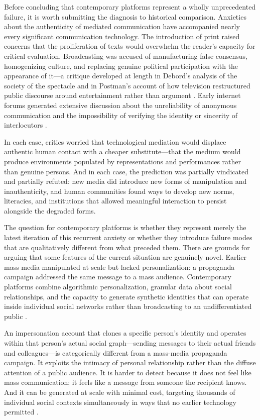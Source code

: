 \documentclass[12pt,a4paper]{article}
\begin{document}
Before concluding that contemporary platforms represent a wholly unprecedented failure, it is
worth submitting the diagnosis to historical comparison. Anxieties about the authenticity of
mediated communication have accompanied nearly every significant communication technology.
The introduction of print raised concerns that the proliferation of texts would overwhelm the
reader's capacity for critical evaluation. Broadcasting was accused of manufacturing false
consensus, homogenizing culture, and replacing genuine political participation with the
appearance of it---a critique developed at length in Debord's analysis of the society of the
spectacle \citep{debord1967} and in Postman's account of how television restructured public
discourse around entertainment rather than argument \citep{postman1985}. Early internet forums
generated extensive discussion about the unreliability of anonymous communication and the
impossibility of verifying the identity or sincerity of interlocutors \citep{boyd2014}.

In each case, critics worried that technological mediation would displace authentic human contact
with a cheaper substitute---that the medium would produce environments populated by
representations and performances rather than genuine persons. And in each case, the prediction
was partially vindicated and partially refuted: new media did introduce new forms of manipulation
and inauthenticity, and human communities found ways to develop new norms, literacies, and
institutions that allowed meaningful interaction to persist alongside the degraded forms.

The question for contemporary platforms is whether they represent merely the latest iteration of
this recurrent anxiety or whether they introduce failure modes that are qualitatively different
from what preceded them. There are grounds for arguing that some features of the current
situation are genuinely novel. Earlier mass media manipulated at scale but lacked personalization:
a propaganda campaign addressed the same message to a mass audience. Contemporary platforms
combine algorithmic personalization, granular data about social relationships, and the capacity
to generate synthetic identities that can operate inside individual social networks rather than
broadcasting to an undifferentiated public \citep{vosoughi2018,bakshy2015}.

An impersonation account that clones a specific person's identity and operates within that
person's actual social graph---sending messages to their actual friends and colleagues---is
categorically different from a mass-media propaganda campaign. It exploits the intimacy of
personal relationship rather than the diffuse attention of a public audience. It is harder to
detect because it does not feel like mass communication; it feels like a message from someone
the recipient knows. And it can be generated at scale with minimal cost, targeting thousands of
individual social contexts simultaneously in ways that no earlier technology permitted
\citep{vosoughi2018}.
\end{document}
